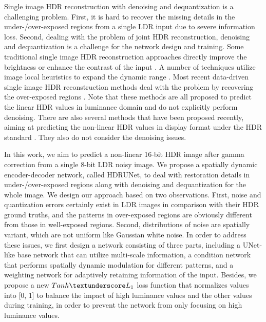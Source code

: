 \documentclass[final]{cvpr}
\begin{document}
Single image HDR reconstruction with denoising and dequantization is a challenging problem. First, it is hard to recover the missing details in the under-/over-exposed regions from a single LDR input due to severe information loss. Second, dealing with the problem of joint HDR reconstruction, denoising and dequantization is a challenge for the network design and training. Some traditional single image HDR reconstruction approaches directly improve the brightness or enhance the contrast of the input \cite{masia2009evaluation, masia2017, akyuz2007hdr}. A number of techniques utilize image local heuristics to expand the dynamic range \cite{banterle2006inverse, kovaleski2014high}. Most recent data-driven single image HDR reconstruction methods deal with the problem by recovering the over-exposed regions \cite{eilertsen2017hdr}. Note that these methods are all proposed to predict the linear HDR values in luminance domain and do not explicitly perform denoising. There are also several methods that have been proposed recently, aiming at predicting the non-linear HDR values in display format under the HDR standard \cite{kim2019deep, kim2020jsi}. They also do not consider the denoising issues.  

In this work, we aim to predict a non-linear 16-bit HDR image after gamma correction from a single 8-bit LDR noisy image. We propose a spatially dynamic encoder-decoder network, called HDRUNet, to deal with restoration details in under-/over-exposed regions along with denoising and dequantization for the whole image. We design our approach based on two observations. First, noise and quantization errors certainly exist in LDR images in comparison with their HDR ground truths, and the patterns in over-exposed regions are obviously different from those in well-exposed regions. Second, distributions of noise are spatially variant, which are not uniform like Gaussian white noise. In order to address these issues, we first design a network consisting of three parts, including a UNet-like base network that can utilize multi-scale information, a condition network that performs spatially dynamic modulation for different patterns, and a weighting network for adaptively retaining information of the input. Besides, we propose a new $Tanh \textunderscore L_1$ loss function that normalizes values into [0, 1] to balance the impact of high luminance values and the other values during training, in order to prevent the network from only focusing on high luminance values.
\end{document}
